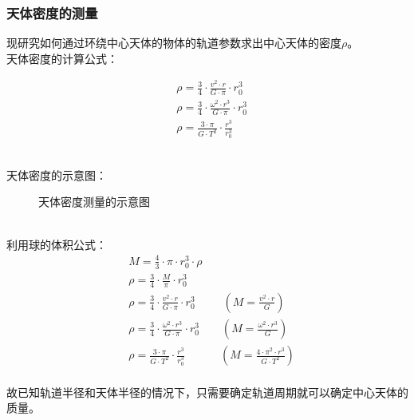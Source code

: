 \documentclass[UTF8]{ctexart}
\begin{document}
\newpage

\subsubsection{天体密度的测量}
    \setcounter{equation}{0}
    现研究如何通过环绕中心天体的物体的轨道参数求出中心天体的密度$\rho$。\\[3mm]
    天体密度的计算公式：
    \begin{large}
        \begin{align*}
            &\rho=\frac{3}{4}\cdot\frac{v^2\cdot r}{G\cdot\pi}\cdot r_0^3\\[6mm]
            &\rho=\frac{3}{4}\cdot\frac{\omega^2\cdot r^3}{G\cdot\pi}\cdot r_0^3\\[6mm]
            &\rho=\frac{3\cdot \pi}{G\cdot T^2}\cdot\frac{r^3}{r_0^3}
        \end{align*}
    \end{large}\\
    天体密度的示意图：
    \begin{figure}[h]
        \begin{center}
            \caption{天体密度测量的示意图}
        \end{center}
    \end{figure}\\
    利用球的体积公式：
    \begin{align}
        &M=\frac{4}{3}\cdot\pi\cdot r_0^3\cdot \rho\\[3mm]
        &\rho=\frac{3}{4}\cdot\frac{M}{\pi}\cdot r_0^3\\[3mm]
        &\rho=\frac{3}{4}\cdot\frac{v^2\cdot r}{G\cdot\pi}\cdot r_0^3
        \hspace{30pt}\left(M=\frac{v^2\cdot r}{G}\right)\\[3mm]
        &\rho=\frac{3}{4}\cdot\frac{\omega^2\cdot r^3}{G\cdot\pi}\cdot r_0^3
        \hspace{24pt}\left(M=\frac{\omega^2\cdot r^3}{G}\right)\\[3mm]
        &\rho=\frac{3\cdot \pi}{G\cdot T^2}\cdot\frac{r^3}{r_0^3}
        \hspace{38pt}\left(M=\frac{4\cdot\pi^2\cdot r^3}{G\cdot T^2}\right)
    \end{align}\\
    故已知轨道半径和天体半径的情况下，只需要确定轨道周期就可以确定中心天体的质量。
    
\end{document}
